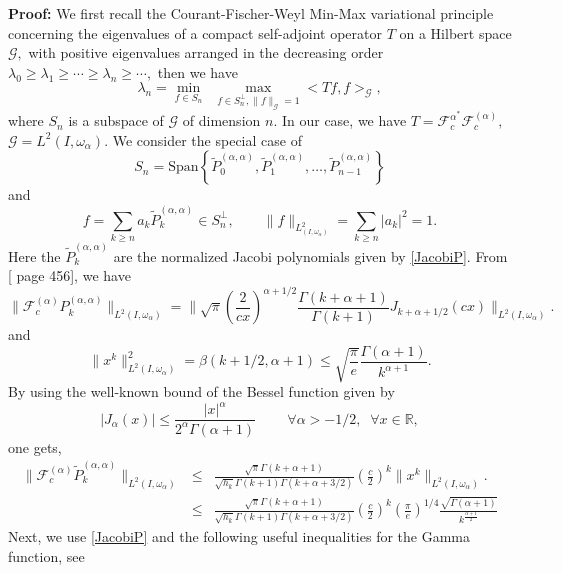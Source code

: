 \documentclass[]{article}
\newcommand{\J}{P^{(\alpha,\alpha)}}
\newcommand{\wJ}{\widetilde P^{(\alpha,\alpha)}}
\newcommand\ds{\displaystyle}
\newcounter{rea}
\begin{document}
\noindent
{\bf Proof:} We first recall the Courant-Fischer-Weyl Min-Max variational principle concerning the eigenvalues
of a  compact self-adjoint operator $T$ on a Hilbert space $\mathcal G,$ with positive eigenvalues arranged in the decreasing order $\lambda_0\geq \lambda_1\geq \cdots\geq \lambda_n\geq \cdots ,$ then we have
$$\lambda_n = \min_{f\in S_n}\,\,\,  \max_{f\in S_n^{\perp},\|f\|_{\mathcal G}=1} < Tf, f>_{\mathcal G},$$
where $S_n$ is a subspace of $\mathcal G$ of dimension $n.$ In our case, we have $T=\mathcal F_c^{\alpha^*}\mathcal F_c^{(\alpha)},$ $\mathcal G= L^2(I,\omega_{\alpha}).$ We consider the special case of  $$S_n=\mbox{Span}\left\{\wJ_0, \wJ_1,\ldots,\wJ_{n-1}\right\}$$ and
$$f=\ds\sum_{k\geq n} a_k \wJ_k \in S_n^{\perp},\qquad
\parallel f\parallel_{L^2_{(I,\omega_\alpha)}}=\ds\sum_{k\geq n}|a_k|^2=1.$$
Here the $ \wJ_{k} $ are the normalized Jacobi polynomials given by \eqref{JacobiP}.
From [\cite{NIST} page 456], we have
\begin{equation}\label{Eq3.2}
\| \mathcal F_c^{(\alpha)} \J_k\|_{L^2(I,\omega_{\alpha})} = \parallel \sqrt{\pi} \left(\frac{2}{cx}\right) ^{\alpha+1/2} \frac{\Gamma(k+\alpha+1)}{\Gamma(k+1)}J_{k+\alpha+1/2}(cx)
\parallel_{L^2(I,\omega_{\alpha})}.
\end{equation}
and
\begin{equation}\label{5}
\parallel  x^k
\parallel_{L^2(I,\omega_{\alpha})}^2=\beta(k+1/2,\alpha+1)\leq \sqrt{\frac{\pi}{e}}\frac{\Gamma(\alpha+1)}{k^{\alpha+1}}.
\end{equation}
By using the well-known  bound of the Bessel function given by
\begin{equation}\label{1}
|J_{\alpha}(x)|\leq \frac{|x|^{\alpha}}{2^{\alpha}\Gamma(\alpha+1)}\;\;\;\;\;\;\;\;\forall\alpha>-1/2, \;\; \forall x \in \mathbb{R},
\end{equation}
one gets,
\begin{eqnarray}
\| \mathcal F_c^{(\alpha)} \wJ_k\|_{L^2(I,\omega_{\alpha})}
&\leq & \frac{\sqrt{\pi}\Gamma(k+\alpha+1)}{\sqrt{h_k}\Gamma(k+1)\Gamma(k+\alpha+3/2)}\left(\frac{c}{2}\right) ^{k} \parallel  x^k
\parallel_{L^2(I,\omega_{\alpha})}. \nonumber\\
&\leq & \frac{\sqrt{\pi}\Gamma(k+\alpha+1)}{\sqrt{h_k}\Gamma(k+1)\Gamma(k+\alpha+3/2)}\left(\frac{c}{2}\right) ^{k}\left(\frac{\pi}{e}\right)^{1/4}\frac{\sqrt{\Gamma(\alpha+1)}}{k^{\frac{\alpha+1}{2}}}
\end{eqnarray}
Next, we use \eqref{JacobiP} and the following useful inequalities for the Gamma function, see  \cite{Batir}
\end{document}
